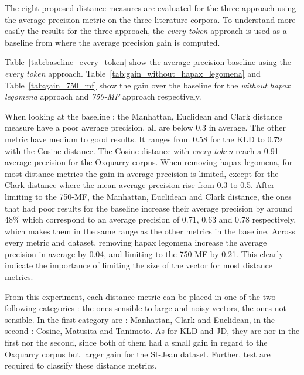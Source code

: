 The eight proposed distance measures are evaluated for the three approach using the average precision metric on the three literature corpora.
To understand more easily the results for the three approach, the \textit{every token} approach is used as a baseline from where the average precision gain is computed.

Table~\ref{tab:baseline_every_token} show the average precision baseline using the \textit{every token} approach.
Table~\ref{tab:gain_without_hapax_legomena} and Table~\ref{tab:gain_750_mf} show the gain over the baseline for the \textit{without hapax legomena} approach and \textit{750-MF} approach respectively.

When looking at the baseline : the Manhattan, Euclidean and Clark distance measure have a poor average precision, all are below 0.3 in average.
The other metric have medium to good results.
It ranges from 0.58 for the KLD to 0.79 with the Cosine distance.
The Cosine distance with \textit{every token} reach a 0.91 average precision for the Oxquarry corpus.
When removing hapax legomena, for most distance metrics the gain in average precision is limited, except for the Clark distance where the mean average precision rise from 0.3 to 0.5.
After limiting to the 750-MF, the Manhattan, Euclidean and Clark distance, the ones that had poor results for the baseline increase their average precision by around 48\% which correspond to an average precision of 0.71, 0.63 and 0.78 respectively, which makes them in the same range as the other metrics in the baseline.
Across every metric and dataset, removing hapax legomena increase the average precision in average by 0.04, and limiting to the 750-MF by 0.21.
This clearly indicate the importance of limiting the size of the vector for most distance metrics.

From this experiment, each distance metric can be placed in one of the two following categories : the ones sensible to large and noisy vectors, the ones not sensible.
In the first category are : Manhattan, Clark and Euclidean, in the second : Cosine, Matusita and Tanimoto.
As for KLD and JD, they are nor in the first nor the second, since both of them had a small gain in regard to the Oxquarry corpus but larger gain for the St-Jean dataset.
Further, test are required to classify these distance metrics.

